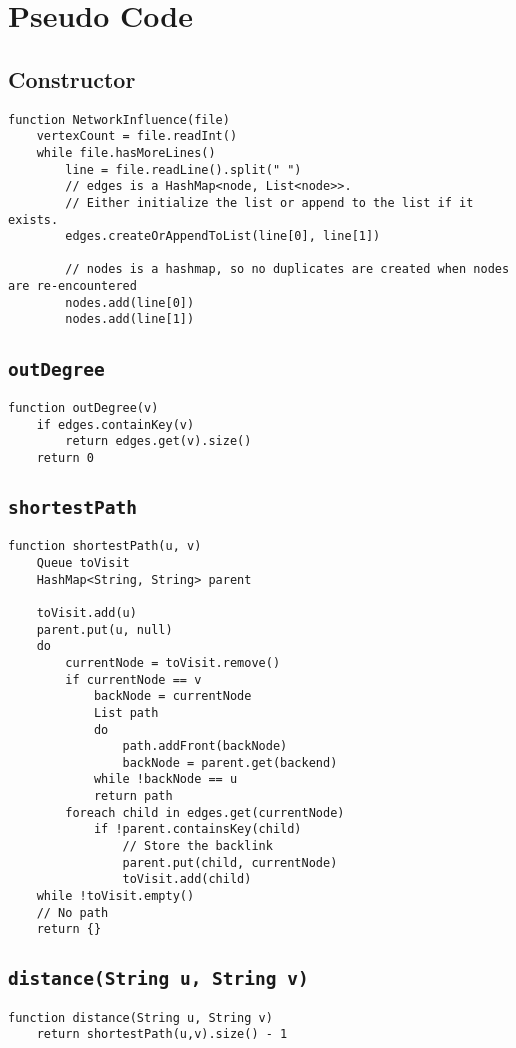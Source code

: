 \documentclass[10pt,letterpaper]{article}
\begin{document}
\section{Pseudo Code}
\subsection{Constructor}
\begin{verbatim}
function NetworkInfluence(file)
    vertexCount = file.readInt()
    while file.hasMoreLines()
        line = file.readLine().split(" ")
        // edges is a HashMap<node, List<node>>.
        // Either initialize the list or append to the list if it exists.
        edges.createOrAppendToList(line[0], line[1])
        
        // nodes is a hashmap, so no duplicates are created when nodes are re-encountered
        nodes.add(line[0])
        nodes.add(line[1])
\end{verbatim}
\subsection{\texttt{outDegree}}
\begin{verbatim}
function outDegree(v)
    if edges.containKey(v)
        return edges.get(v).size()
	return 0
\end{verbatim}
\subsection{\texttt{shortestPath}}
\begin{verbatim}
function shortestPath(u, v)
   	Queue toVisit
   	HashMap<String, String> parent
   	
   	toVisit.add(u)
   	parent.put(u, null)
   	do
   	    currentNode = toVisit.remove()
   	    if currentNode == v
   	        backNode = currentNode
   	        List path
   	        do 
   	            path.addFront(backNode)
   	            backNode = parent.get(backend)
   	        while !backNode == u
   	        return path
   	    foreach child in edges.get(currentNode)
   	        if !parent.containsKey(child)
   	            // Store the backlink
   	            parent.put(child, currentNode)
   	            toVisit.add(child)
   	while !toVisit.empty()
   	// No path
   	return {}
\end{verbatim}
\subsection{\texttt{distance(String u, String v)}}
\begin{verbatim}
function distance(String u, String v) 
   	return shortestPath(u,v).size() - 1
\end{verbatim}
\end{document}
